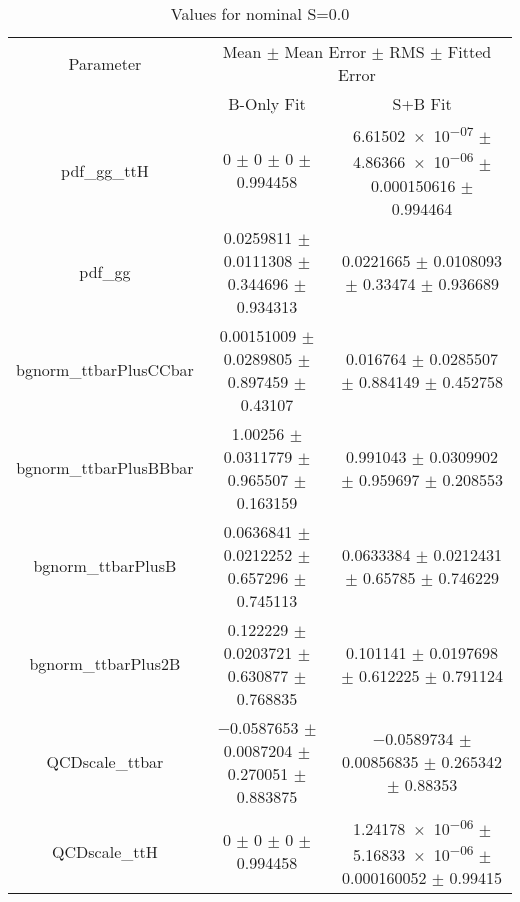\begin{table}
\centering
\caption{Values for nominal S=0.0}
\begin{tabular}{ccc}
\toprule
Parameter & \multicolumn{2}{c}{Mean $\pm$ Mean Error $\pm$ RMS $\pm$ Fitted Error}\\
 & B-Only Fit & S+B Fit\\
\midrule
pdf\_gg\_ttH & \num{0} $\pm$ \num{0} $\pm$ \num{0} $\pm$ \num{0.994458} & \num{6.61502e-07} $\pm$ \num{4.86366e-06} $\pm$ \num{0.000150616} $\pm$ \num{0.994464}\\
pdf\_gg & \num{0.0259811} $\pm$ \num{0.0111308} $\pm$ \num{0.344696} $\pm$ \num{0.934313} & \num{0.0221665} $\pm$ \num{0.0108093} $\pm$ \num{0.33474} $\pm$ \num{0.936689}\\
bgnorm\_ttbarPlusCCbar & \num{0.00151009} $\pm$ \num{0.0289805} $\pm$ \num{0.897459} $\pm$ \num{0.43107} & \num{0.016764} $\pm$ \num{0.0285507} $\pm$ \num{0.884149} $\pm$ \num{0.452758}\\
bgnorm\_ttbarPlusBBbar & \num{1.00256} $\pm$ \num{0.0311779} $\pm$ \num{0.965507} $\pm$ \num{0.163159} & \num{0.991043} $\pm$ \num{0.0309902} $\pm$ \num{0.959697} $\pm$ \num{0.208553}\\
bgnorm\_ttbarPlusB & \num{0.0636841} $\pm$ \num{0.0212252} $\pm$ \num{0.657296} $\pm$ \num{0.745113} & \num{0.0633384} $\pm$ \num{0.0212431} $\pm$ \num{0.65785} $\pm$ \num{0.746229}\\
bgnorm\_ttbarPlus2B & \num{0.122229} $\pm$ \num{0.0203721} $\pm$ \num{0.630877} $\pm$ \num{0.768835} & \num{0.101141} $\pm$ \num{0.0197698} $\pm$ \num{0.612225} $\pm$ \num{0.791124}\\
QCDscale\_ttbar & \num{-0.0587653} $\pm$ \num{0.0087204} $\pm$ \num{0.270051} $\pm$ \num{0.883875} & \num{-0.0589734} $\pm$ \num{0.00856835} $\pm$ \num{0.265342} $\pm$ \num{0.88353}\\
QCDscale\_ttH & \num{0} $\pm$ \num{0} $\pm$ \num{0} $\pm$ \num{0.994458} & \num{1.24178e-06} $\pm$ \num{5.16833e-06} $\pm$ \num{0.000160052} $\pm$ \num{0.99415}\\
\bottomrule
\end{tabular}
\end{table}